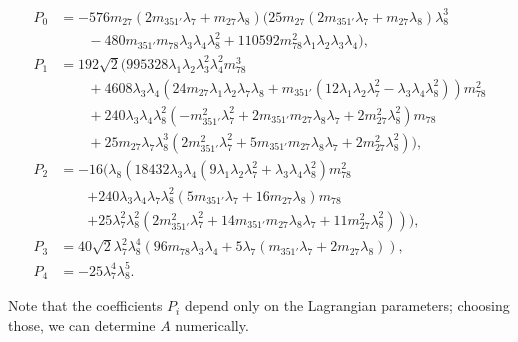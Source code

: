 \documentclass[a4paper,12pt]{article}
\begin{document}
\begin{itemize}
\begin{align}
    P_0&=-576 m_{27} \left(2 m_{351'} \lambda_7+m_{27} \lambda_8\right)\Big(25 m_{27} \left(2 m_{351'} \lambda_7+m_{27} \lambda_8\right) \lambda_8^3\nonumber\\
    &\qquad -480 m_{351'} m_{78} \lambda_3
   \lambda_4 \lambda_8^2+110592 m_{78}^2 \lambda_1 \lambda_2 \lambda_3 \lambda_4\Big),\\
   P_1&=192\sqrt{2}\Big(995328 \lambda_1 \lambda_2 \lambda_3^2 \lambda_4^2 m_{78}^3\nonumber\\
   &\qquad +4608 \lambda_3 \lambda_4 \left(24 m_{27} \lambda_1 \lambda_2 \lambda_7 \lambda_8+m_{351'} \left(12 \lambda
   _1 \lambda_2 \lambda_7^2-\lambda_3 \lambda_4 \lambda_8^2\right)\right) m_{78}^2\nonumber\\
   &\qquad +240 \lambda_3 \lambda_4 \lambda_8^2 \left(-m_{351'}^2 \lambda_7^2+2 m_{351'} m_{27} \lambda
   _8 \lambda_7+2 m_{27}^2 \lambda_8^2\right) m_{78}\nonumber\\
   &\qquad+25 m_{27} \lambda_7 \lambda_8^3 \left(2 m_{351'}^2 \lambda_7^2+5 m_{351'} m_{27} \lambda_8 \lambda_7+2 m_{27}^2 \lambda_8^2\right)\Big),\\
   P_2&=-16\Big(\lambda _8 \left(18432 \lambda _3 \lambda _4 \left(9 \lambda _1 \lambda _2 \lambda _7^2+\lambda _3 \lambda _4 \lambda _8^2\right) m_{78}^2\right.\nonumber\\
   &\qquad \left.+240 \lambda _3 \lambda _4 \lambda
   _7 \lambda _8^2 \left(5 m_{351'} \lambda _7+16 m_{27} \lambda _8\right) m_{78}\right.\nonumber\\
   &\qquad \left.+25 \lambda _7^2 \lambda _8^2 \left(2 m_{351'}^2 \lambda _7^2+14 m_{351'} m_{27} \lambda _8 \lambda
   _7+11 m_{27}^2 \lambda _8^2\right)\right)\Big),\\
   P_3&=40\sqrt{2}\lambda _7^2 \lambda _8^4 \left(96 m_{78} \lambda _3 \lambda _4+5 \lambda _7 \left(m_{351'} \lambda _7+2 m_{27} \lambda _8\right)\right),\\
   P_4&=-25\lambda _7^4 \lambda _8^5.
    \end{align}

Note that the coefficients $P_i$ depend only on the Lagrangian parameters; choosing those, we can determine $A$ numerically.


\end{itemize}
\end{document}
